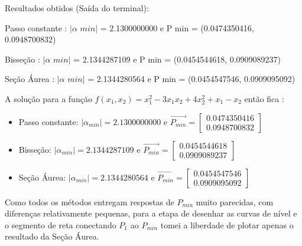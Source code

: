 \documentclass[10pt, a4paper]{article}
\begin{document}
Resultados obtidos (Saída do terminal):
\newline


Passo constante : $|\alpha \,\, min|$ = 2.1300000000 e P min = (0.0474350416, 0.0948700832)

Bisseção        : $|\alpha \,\, min|$ = 2.1344287109 e P min = (0.0454544618, 0.0909089237)

Seção Áurea     : $|\alpha \,\,  min|$ = 2.1344280564 e P min = (0.0454547546, 0.0909095092)\newline

A solução para a função $f(x_1, x_2) = x_1^2 - 3x_1x_2 + 4x_2^2 + x_1 - x_2$ então fica :
\newline

\begin{itemize}
  \item Passo constante: $|\alpha_{min}| = 2.1300000000$ e $\overrightarrow{P_{min}} =  
  \begin{bmatrix}
    0.0474350416 \\ 0.0948700832
  \end{bmatrix}$
  \item Bisseção: $|\alpha_{min}| = 2.1344287109$ e $\overrightarrow{P_{min}} =  
  \begin{bmatrix}
    0.0454544618 \\ 0.0909089237
  \end{bmatrix}$
  \item Seção Áurea: $|\alpha_{min}| = 2.1344280564$ e $\overrightarrow{P_{min}} =  
  \begin{bmatrix}
    0.0454547546 \\ 0.0909095092
  \end{bmatrix}$
\end{itemize}

Como todos os métodos entregam respostas de $P_{min}$ muito parecidas, com diferenças relativamente pequenas,
para a etapa de desenhar as curvas de nível e o segmento de reta conectando $P_1$ ao $P_{min}$ tomei a liberdade
de plotar apenas o resultado da Seção Áurea.
\end{document}
